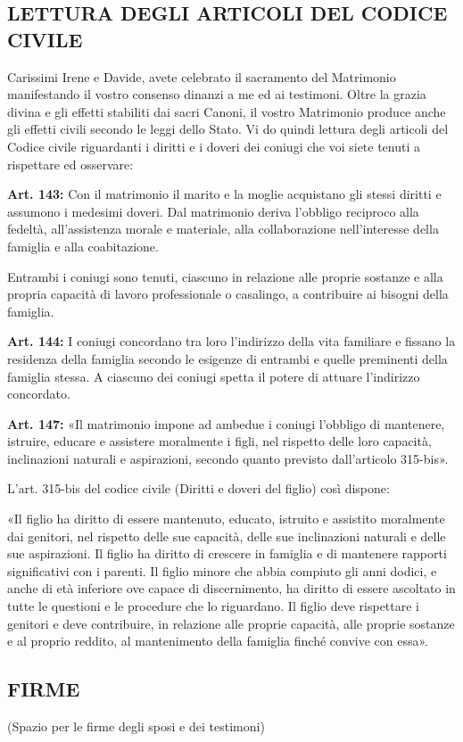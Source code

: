 
\subsection*{LETTURA DEGLI ARTICOLI DEL CODICE CIVILE}

\begin{dialoghi}
\item[\sacerdote] Carissimi Irene e Davide, avete celebrato il sacramento del Matrimonio manifestando il vostro consenso dinanzi a me ed ai testimoni. Oltre la grazia divina e gli effetti stabiliti dai sacri Canoni, il vostro Matrimonio produce anche gli effetti civili secondo le leggi dello Stato. Vi do quindi lettura degli articoli del Codice civile riguardanti i diritti e i doveri dei coniugi che voi siete tenuti a rispettare ed osservare:

\textbf{Art. 143:} Con il matrimonio il marito e la moglie acquistano gli stessi diritti e assumono i medesimi doveri. Dal matrimonio deriva l'obbligo reciproco alla fedeltà, all'assistenza morale e materiale, alla collaborazione nell'interesse della famiglia e alla coabitazione.

Entrambi i coniugi sono tenuti, ciascuno in relazione alle proprie sostanze e alla propria capacità di lavoro professionale o casalingo, a contribuire ai bisogni della famiglia.

\textbf{Art. 144:} I coniugi concordano tra loro l'indirizzo della vita familiare e fissano la residenza della famiglia secondo le esigenze di entrambi e quelle preminenti della famiglia stessa. A ciascuno dei coniugi spetta il potere di attuare l'indirizzo concordato.

\textbf{Art. 147:} «Il matrimonio impone ad ambedue i coniugi l'obbligo di mantenere, istruire, educare e assistere moralmente i figli, nel rispetto delle loro capacità, inclinazioni naturali e aspirazioni, secondo quanto previsto dall'articolo 315-bis».

L'art. 315-bis del codice civile (Diritti e doveri del figlio) così dispone:

«Il figlio ha diritto di essere mantenuto, educato, istruito e assistito moralmente dai genitori, nel rispetto delle sue capacità, delle sue inclinazioni naturali e delle sue aspirazioni. Il figlio ha diritto di crescere in famiglia e di mantenere rapporti significativi con i parenti. Il figlio minore che abbia compiuto gli anni dodici, e anche di età inferiore ove capace di discernimento, ha diritto di essere ascoltato in tutte le questioni e le procedure che lo riguardano. Il figlio deve rispettare i genitori e deve contribuire, in relazione alle proprie capacità, alle proprie sostanze e al proprio reddito, al mantenimento della famiglia finché convive con essa».
\end{dialoghi}

\subsection*{FIRME}

\begin{dialoghi}
\item[\sacerdote] (Spazio per le firme degli sposi e dei testimoni)
\end{dialoghi}